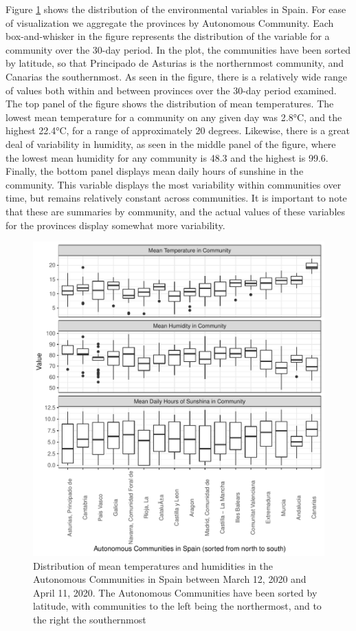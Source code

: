 \documentclass[]{elsarticle} %
\makeatletter
\def\maxwidth{\ifdim\Gin@nat@width>\linewidth\linewidth
\else\Gin@nat@width\fi}
\let\Oldincludegraphics\includegraphics
\renewcommand{\includegraphics}[1]{\Oldincludegraphics[width=\maxwidth]{#1}}
\makeatother
\begin{document}
Figure \ref{fig:descriptives-temperature} shows the distribution of the
environmental variables in Spain. For ease of visualization we aggregate
the provinces by Autonomous Community. Each box-and-whisker in the
figure represents the distribution of the variable for a community over
the 30-day period. In the plot, the communities have been sorted by
latitude, so that Principado de Asturias is the northernmost community,
and Canarias the southernmost. As seen in the figure, there is a
relatively wide range of values both within and between provinces over
the 30-day period examined. The top panel of the figure shows the
distribution of mean temperatures. The lowest mean temperature for a
community on any given day was 2.8°C, and the highest 22.4°C, for a
range of approximately 20 degrees. Likewise, there is a great deal of
variability in humidity, as seen in the middle panel of the figure,
where the lowest mean humidity for any community is 48.3 and the highest
is 99.6. Finally, the bottom panel displays mean daily hours of sunshine
in the community. This variable displays the most variability within
communities over time, but remains relatively constant across
communities. It is important to note that these are summaries by
community, and the actual values of these variables for the provinces
display somewhat more variability.

\begin{figure}
\centering
\includegraphics{Environmental-Correlates-of-COVID19-Spain_files/figure-latex/descriptives-temperature-1.pdf}
\caption{\label{fig:descriptives-temperature} Distribution of mean
temperatures and humidities in the Autonomous Communities in Spain
between March 12, 2020 and April 11, 2020. The Autonomous Communities
have been sorted by latitude, with communities to the left being the
northermost, and to the right the southernmost}
\end{figure}
\end{document}
